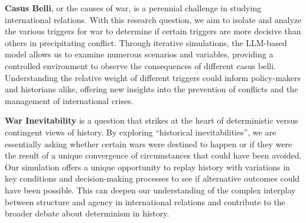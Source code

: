 \documentclass{article}
\begin{document}
\par \textbf{Casus Belli}, or the causes of war, is a perennial challenge in studying international relations. With this research question, we aim to isolate and analyze the various triggers for war to determine if certain triggers are more decisive than others in precipitating conflict. Through iterative simulations, the LLM-based model allows us to examine numerous scenarios and variables, providing a controlled environment to observe the consequences of different casus belli. Understanding the relative weight of different triggers could inform policy-makers and historians alike, offering new insights into the prevention of conflicts and the management of international crises.

\par \textbf{War Inevitability} is a question that strikes at the heart of deterministic versus contingent views of history. By exploring ``historical inevitabilities'', we are essentially asking whether certain wars were destined to happen or if they were the result of a unique convergence of circumstances that could have been avoided. Our simulation offers a unique opportunity to replay history with variations in key conditions and decision-making processes to see if alternative outcomes could have been possible. This can deepen our understanding of the complex interplay between structure and agency in international relations and contribute to the broader debate about determinism in history.

\end{document}
